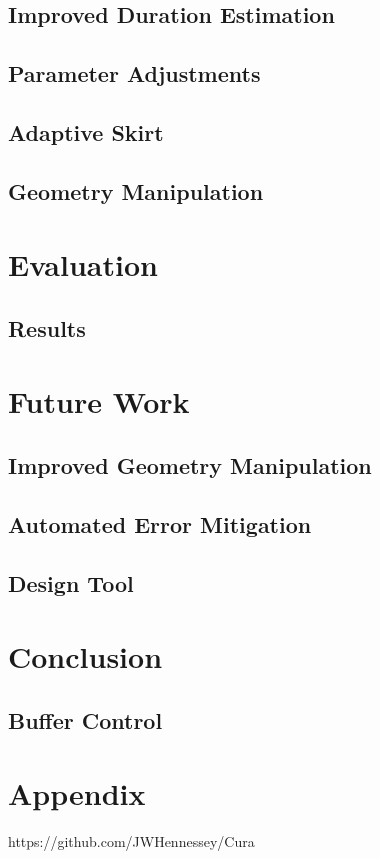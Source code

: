 \documentclass[11pt]{report} %
\begin{document}
\section{Improved Duration Estimation}



\section{Parameter Adjustments}



\section{Adaptive Skirt}



\section{Geometry Manipulation}



\chapter{Evaluation}
\section{Results}




\chapter{Future Work}
\section{Improved Geometry Manipulation}




\section{Automated Error Mitigation}




\section{Design Tool}




\chapter{Conclusion}

\section{Buffer Control}


\chapter{Appendix}
\label{section:AppendixA}
https://github.com/JWHennessey/Cura

\nocite{*}


\end{document}
